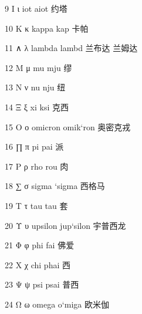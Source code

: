 9 Ι ι iot aiot 约塔

10 Κ κ kappa kap 卡帕

11 ∧ λ lambda lambd 兰布达 兰姆达

12 Μ μ mu mju 缪

13 Ν ν nu nju 纽

14 Ξ ξ xi ksi 克西

15 Ο ο omicron omik`ron 奥密克戎

16 ∏ π pi pai 派

17 Ρ ρ rho rou 肉

18 ∑ σ sigma `sigma 西格马

19 Τ τ tau tau 套

20 Υ υ upsilon jup`silon 宇普西龙

21 Φ φ phi fai 佛爱

22 Χ χ chi phai 西

23 Ψ ψ psi psai 普西

24 Ω ω omega o`miga 欧米伽

